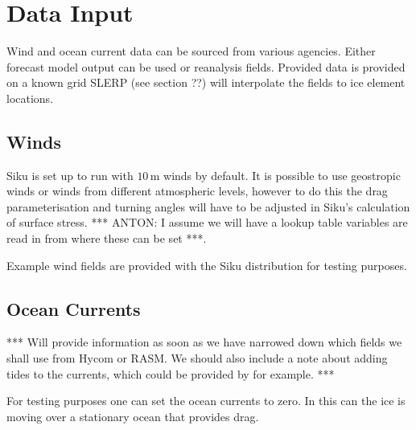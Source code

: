 %
\section{Data Input}
% 

Wind and ocean current data can be sourced from various agencies. Either forecast model output can be used or reanalysis fields. Provided data is provided on a known grid SLERP (see section ??) will interpolate the fields to ice element locations.

%
\subsection{Winds}
%

Siku is set up to run with $10\,\mathrm{m}$ winds by default. It is possible to use geostropic winds or winds from different atmospheric levels, however to do this the drag parameterisation and turning angles will have to be adjusted in Siku's calculation of surface stress. {\color{red} *** ANTON: I assume we will have a lookup table variables are read in from where these can be set ***.}

Example wind fields are provided with the Siku distribution for testing purposes. 

%
\subsection{Ocean Currents}
%

{\color{red} *** Will provide information as soon as we have narrowed down which fields we shall use from Hycom or RASM. We should also include a note about adding tides to the currents, which could be provided by \cite{Kowalik&Proshutinsky??} for example. ***}

For testing purposes one can set the ocean currents to zero. In this can the ice is moving over a stationary ocean that provides drag. 
